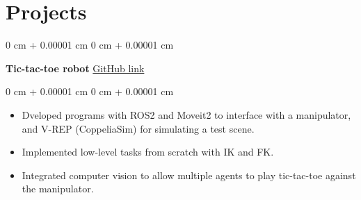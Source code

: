 \documentclass[10pt, letterpaper]{article}
\newenvironment{highlights}{
    \begin{itemize}[
        topsep=0.10 cm,
        parsep=0.10 cm,
        partopsep=0pt,
        itemsep=0pt,
        leftmargin=0 cm + 10pt
    ]
}{
    \end{itemize}
} %
\newenvironment{onecolentry}{
    \begin{adjustwidth}{
        0 cm + 0.00001 cm
    }{
        0 cm + 0.00001 cm
    }
}{
    \end{adjustwidth}
} %
\newenvironment{twocolentry}[2][]{
    \onecolentry
    \def\secondColumn{#2}
    \setcolumnwidth{\fill, 4.5 cm}
    \begin{paracol}{2}
}{
    \switchcolumn \raggedleft \secondColumn
    \end{paracol}
    \endonecolentry
} %
\begin{document}
   


    
    \section{Projects}
        
        \begin{twocolentry}{
            \href{https://github.com/Abban-Fahim/b38ro-project/}{GitHub link}
        }
            \textbf{Tic-tac-toe robot}\end{twocolentry}

        \vspace{0.10 cm}
        \begin{onecolentry}
            \begin{highlights}
            \item Dveloped programs with ROS2 and Moveit2 to interface with a manipulator, and V-REP (CoppeliaSim) for simulating a test scene.
            \item Implemented low-level tasks from scratch with IK and FK.
            \item Integrated computer vision to allow multiple agents to play tic-tac-toe against the manipulator.
            \end{highlights}
        \end{onecolentry}
\end{document}
